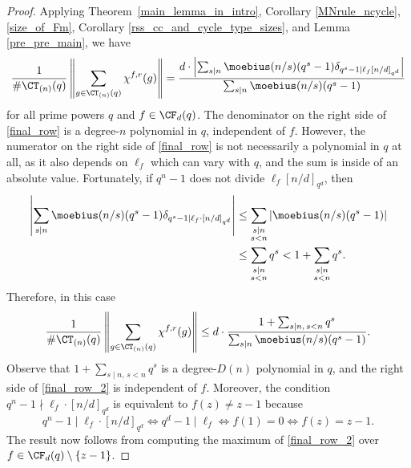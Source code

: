 \begin{proof}
Applying Theorem~\ref{main_lemma_in_intro}, Corollary \ref{MNrule_ncycle}, \eqref{size_of_Fm}, Corollary \ref{rss_cc_and_cycle_type_sizes}, and Lemma \ref{pre_pre_main}, we have
\begin{equation}
\label{final_row}
\frac{
1
}{
\# \CT_{(n)} (q)
}
\left \|
\sum_{g \in \CT_{(n)} (q)} \chi^{f,r} (g)
\right \|
=
\frac{d \cdot \left | \sum_{s \mid n} \moebius(n/s)(q^s-1) \delta_{q^s - 1 \mid \ell_{f} [n/d]_{q^d}} \right | }{\sum_{s \mid n} \moebius(n/s)(q^s-1)}
\end{equation}
for all prime powers \(q\) and \(f \in \CF_d (q)\).
The denominator on the right side of \eqref{final_row} is a degree-\(n\) polynomial in \(q\), independent of \(f\).
However, the numerator on the right side of \eqref{final_row} is not necessarily a polynomial in \(q\) at all, as it also depends on \(\ell_{f}\) which can vary with \(q\), and the sum is inside of an absolute value.
Fortunately, if \(q^n - 1\) does not divide \(\ell_{f} [n/d]_{q^d}\), then
\begin{equation}
\label{D_n_bound}
\begin{aligned}
\left | \sum_{s \mid n} \moebius(n/s) (q^s-1) \delta_{q^s-1 \mid \ell_f \cdot [n/d]_{q^d}} \right |
& \leq
\sum_{\substack{s \mid n \\ s < n}}
\left | \moebius (n/s) (q^s-1) \right | \\
& \leq
\sum_{\substack{s \mid n \\ s < n}}
q^s
<
1 + \sum_{\substack{s \mid n \\ s < n}}
q^s.
\end{aligned}
\end{equation}
Therefore, in this case
\begin{equation}
\label{final_row_2}
\frac{
1
}{
\# \CT_{(n)} (q)
}
\left \|
\sum_{g \in \CT_{(n)} (q)} \chi^{f,r} (g)
\right \|
\leq
d \cdot \frac{1 + \sum_{s \mid n, \, s< n} q^s }{\sum_{s \mid n} \moebius(n/s)(q^s-1)}.
\end{equation}
Observe that \(1 + \sum_{s \mid n, \, s < n} q^s\) is a degree-\(D(n)\) polynomial in \(q\), and the right side of \eqref{final_row_2} is independent of \(f\).
Moreover, the condition \(q^n-1 \nmid \ell_f \cdot [n/d]_{q^d}\) is equivalent to \(f(z) \neq z-1\) because
\[
q^n-1 \mid \ell_f \cdot [n/d]_{q^d}
\iff q^d-1 \mid \ell_f
\iff f(1) = 0
\iff f(z) = z-1.
\]
The result now follows from computing the maximum of \eqref{final_row_2} over \mbox{\(f \in \CF_d(q) \setminus \{z-1\}\).}
\end{proof}










